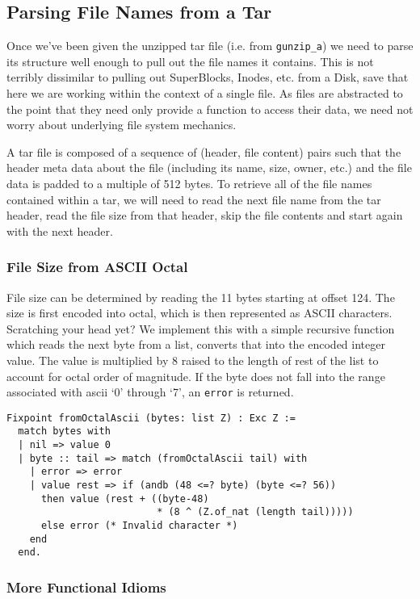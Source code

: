 \documentclass[nocopyrightspace]{sigplanconf}
\begin{document}
\subsection{Parsing File Names from a Tar}
Once we've been given the unzipped tar file (i.e. from {\tt gunzip\_a}) we
need to parse its structure well enough to pull out the file names it
contains. This is not terribly dissimilar to pulling out SuperBlocks, Inodes,
etc. from a Disk, save that here we are working within the context of a single
file. As files are abstracted to the point that they need only provide a
function to access their data, we need not worry about underlying file system
mechanics.

A tar file is composed of a sequence of (header, file content) pairs such that
the header meta data about the file (including its name, size, owner, etc.)
and the file data is padded to a multiple of 512 bytes. To retrieve all of the
file names contained within a tar, we will need to read the next file name
from the tar header, read the file size from that header, skip the file
contents and start again with the next header.

\subsubsection{File Size from ASCII Octal}
File size can be determined by reading the 11 bytes starting at offset 124.
The size is first encoded into octal, which is then represented as ASCII
characters. Scratching your head yet? We implement this with a simple
recursive function which reads the next byte from a list, converts that into
the encoded integer value. The value is multiplied by 8 raised to the length
of rest of the list to account for octal order of magnitude. If the byte does
not fall into the range associated with ascii `0' through `7', an {\tt error}
is returned.

\begin{lstlisting}
Fixpoint fromOctalAscii (bytes: list Z) : Exc Z :=
  match bytes with
  | nil => value 0
  | byte :: tail => match (fromOctalAscii tail) with
    | error => error
    | value rest => if (andb (48 <=? byte) (byte <=? 56))
      then value (rest + ((byte-48)
                          * (8 ^ (Z.of_nat (length tail)))))
      else error (* Invalid character *)
    end
  end.
\end{lstlisting}

\subsubsection{More Functional Idioms}
\end{document}
